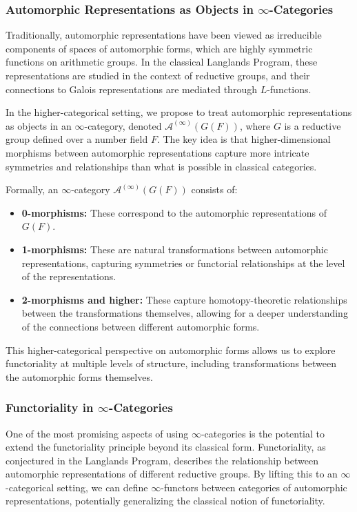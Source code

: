 \documentclass{article}
\theoremstyle{remark}
\begin{document}
\subsubsection{Automorphic Representations as Objects in $\infty$-Categories}

Traditionally, automorphic representations have been viewed as irreducible components of spaces of automorphic forms, which are highly symmetric functions on arithmetic groups. In the classical Langlands Program, these representations are studied in the context of reductive groups, and their connections to Galois representations are mediated through $L$-functions.

In the higher-categorical setting, we propose to treat automorphic representations as objects in an $\infty$-category, denoted $\mathcal{A}^{(\infty)}(G(F))$, where $G$ is a reductive group defined over a number field $F$. The key idea is that higher-dimensional morphisms between automorphic representations capture more intricate symmetries and relationships than what is possible in classical categories.

Formally, an $\infty$-category $\mathcal{A}^{(\infty)}(G(F))$ consists of:
\begin{itemize}
    \item \textbf{0-morphisms:} These correspond to the automorphic representations of $G(F)$.
    \item \textbf{1-morphisms:} These are natural transformations between automorphic representations, capturing symmetries or functorial relationships at the level of the representations.
    \item \textbf{2-morphisms and higher:} These capture homotopy-theoretic relationships between the transformations themselves, allowing for a deeper understanding of the connections between different automorphic forms.
\end{itemize}
This higher-categorical perspective on automorphic forms allows us to explore functoriality at multiple levels of structure, including transformations between the automorphic forms themselves.

\subsubsection{Functoriality in $\infty$-Categories}

One of the most promising aspects of using $\infty$-categories is the potential to extend the functoriality principle beyond its classical form. Functoriality, as conjectured in the Langlands Program, describes the relationship between automorphic representations of different reductive groups. By lifting this to an $\infty$-categorical setting, we can define $\infty$-functors between categories of automorphic representations, potentially generalizing the classical notion of functoriality.
\end{document}
